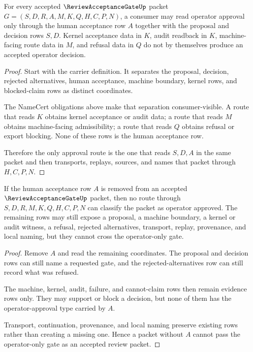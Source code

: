 \begin{theorem}
\label{thm:review-acceptance-gate-human-approval-boundary}
For every accepted $\ReviewAcceptanceGateUp$ packet $G=(S,D,R,A,M,K,Q,H,C,P,N)$, a consumer may read operator approval only through the human acceptance row $A$ together with the proposal and decision rows $S,D$. Kernel acceptance data in $K$, audit readback in $K$, machine-facing route data in $M$, and refusal data in $Q$ do not by themselves produce an accepted operator decision.
\end{theorem}
\begin{proof}
Start with the carrier definition. It separates the proposal, decision, rejected alternatives, human acceptance, machine boundary, kernel rows, and blocked-claim rows as distinct coordinates.

The NameCert obligations above make that separation consumer-visible. A route that reads $K$ obtains kernel acceptance or audit data; a route that reads $M$ obtains machine-facing admissibility; a route that reads $Q$ obtains refusal or export blocking. None of these rows is the human acceptance row.

Therefore the only approval route is the one that reads $S,D,A$ in the same packet and then transports, replays, sources, and names that packet through $H,C,P,N$.
\end{proof}

\begin{theorem}
\label{thm:review-acceptance-gate-non-automation-boundary}
If the human acceptance row $A$ is removed from an accepted $\ReviewAcceptanceGateUp$ packet, then no route through $S,D,R,M,K,Q,H,C,P,N$ can classify the packet as operator approved. The remaining rows may still expose a proposal, a machine boundary, a kernel or audit witness, a refusal, rejected alternatives, transport, replay, provenance, and local naming, but they cannot cross the operator-only gate.
\end{theorem}
\begin{proof}
Remove $A$ and read the remaining coordinates. The proposal and decision rows can still name a requested gate, and the rejected-alternatives row can still record what was refused.

The machine, kernel, audit, failure, and cannot-claim rows then remain evidence rows only. They may support or block a decision, but none of them has the operator-approval type carried by $A$.

Transport, continuation, provenance, and local naming preserve existing rows rather than creating a missing one. Hence a packet without $A$ cannot pass the operator-only gate as an accepted review packet.
\end{proof}

